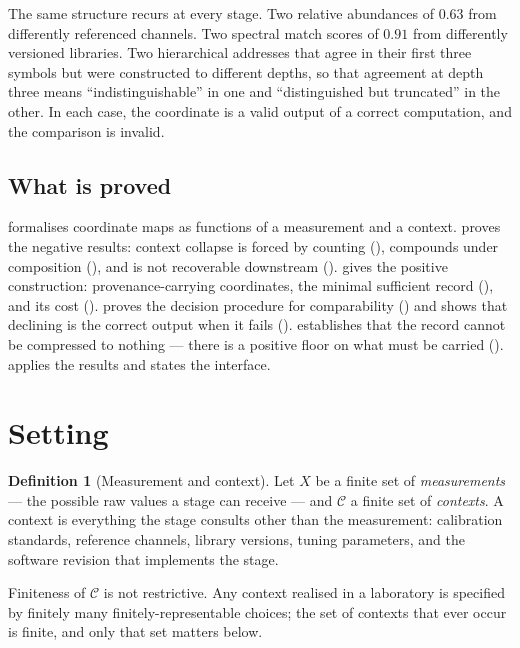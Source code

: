 \documentclass[11pt,a4paper]{article}
\theoremstyle{definition}
\newtheorem{definition}[theorem]{Definition}
\theoremstyle{remark}
\newcommand{\Ctx}{\mathcal{C}}               %
\begin{document}
The same structure recurs at every stage. Two relative abundances of
$0.63$ from differently referenced channels. Two spectral match scores of
$0.91$ from differently versioned libraries. Two hierarchical addresses
that agree in their first three symbols but were constructed to different
depths, so that agreement at depth three means ``indistinguishable'' in
one and ``distinguished but truncated'' in the other. In each case, the
coordinate is a valid output of a correct computation, and the comparison
is invalid.

\subsection{What is proved}

 formalises coordinate maps as functions of a
measurement and a context.  proves the negative
results: context collapse is forced by counting (),
compounds under composition (), and is not
recoverable downstream (). 
gives the positive construction: provenance-carrying coordinates, the
minimal sufficient record (), and its cost
().  proves the decision
procedure for comparability () and shows that
declining is the correct output when it fails
().  establishes that the record
cannot be compressed to nothing --- there is a positive floor on what
must be carried ().  applies
the results and states the interface.

\section{Setting}
\label{sec:setting}

\begin{definition}[Measurement and context]\label{def:meas}
Let $X$ be a finite set of \emph{measurements} --- the possible raw
values a stage can receive --- and $\Ctx$ a finite set of \emph{contexts}.
A context is everything the stage consults other than the measurement:
calibration standards, reference channels, library versions, tuning
parameters, and the software revision that implements the stage.
\end{definition}

Finiteness of $\Ctx$ is not restrictive. Any context realised in a
laboratory is specified by finitely many finitely-representable choices;
the set of contexts that ever occur is finite, and only that set matters
below.
\end{document}
